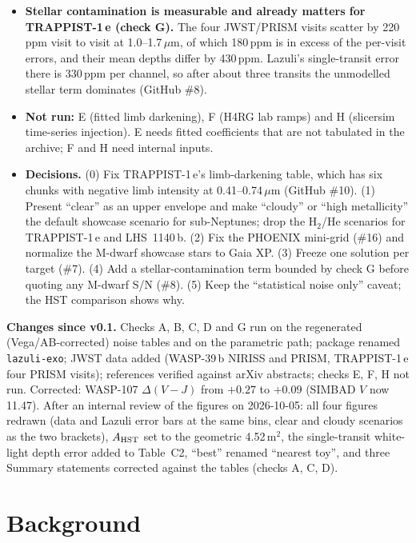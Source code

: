 \documentclass[11pt]{article}
\begin{document}
\begin{itemize}[leftmargin=*]
  \item \textbf{Stellar contamination is measurable and already matters for TRAPPIST-1\,e (check G).} The four JWST/PRISM visits scatter by 220\,ppm visit to visit at 1.0--1.7\,$\mu$m, of which 180\,ppm is in excess of the per-visit errors, and their mean depths differ by 430\,ppm. Lazuli's single-transit error there is 330\,ppm per channel, so after about three transits the unmodelled stellar term dominates (GitHub \#8).
  \item \textbf{Not run:} E (fitted limb darkening), F (H4RG lab ramps) and H (slicersim time-series injection). E needs fitted coefficients that are not tabulated in the archive; F and H need internal inputs.
  \item \textbf{Decisions.} (0) Fix TRAPPIST-1\,e's limb-darkening table, which has six chunks with negative limb intensity at 0.41--0.74\,$\mu$m (GitHub \#10). (1) Present ``clear'' as an upper envelope and make ``cloudy'' or ``high metallicity'' the default showcase scenario for sub-Neptunes; drop the H$_2$/He scenarios for TRAPPIST-1\,e and LHS~1140\,b. (2) Fix the PHOENIX mini-grid (\#16) and normalize the M-dwarf showcase stars to Gaia XP. (3) Freeze one solution per target (\#7). (4) Add a stellar-contamination term bounded by check G before quoting any M-dwarf S/N (\#8). (5) Keep the ``statistical noise only'' caveat; the HST comparison shows why.
\end{itemize}

\noindent\textbf{Changes since v0.1.} Checks A, B, C, D and G run on the regenerated (Vega/AB-corrected) noise tables and on the parametric path; package renamed \texttt{lazuli-exo}; JWST data added (WASP-39\,b NIRISS and PRISM, TRAPPIST-1\,e four PRISM visits); references verified against arXiv abstracts; checks E, F, H not run. Corrected: WASP-107 $\Delta(V{-}J)$ from $+0.27$ to $+0.09$ (SIMBAD $V$ now 11.47). After an internal review of the figures on 2026-10-05: all four figures redrawn (data and Lazuli error bars at the same bins, clear and cloudy scenarios as the two brackets), $A_{\rm HST}$ set to the geometric 4.52\,m$^2$, the single-transit white-light depth error added to Table~C2, ``best'' renamed ``nearest toy'', and three Summary statements corrected against the tables (checks A, C, D).

\section*{Background}
\end{document}
